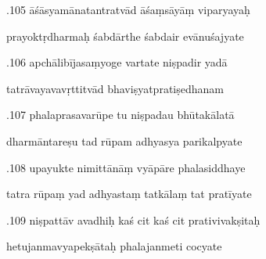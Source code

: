 \documentclass[article,12pt,a4paper]{memoir}%
\newcounter{parCount}
\begin{document}
	  
	  \pstart {}.105 āśāsyamānatantratvād āśaṃsāyāṃ viparyayaḥ 
	{}
	\pend%
      

	  
	  \pstart \leavevmode%
	prayoktṛdharmaḥ śabdārthe śabdair evānuśajyate 
	{}
	\pend%
      

	  
	  \pstart {}.106 apchālibījasaṃyoge vartate niṣpadir yadā 
	{}
	\pend%
      

	  
	  \pstart \leavevmode%
	tatrāvayavavṛttitvād bhaviṣyatpratiṣedhanam 
	{}
	\pend%
      

	  
	  \pstart {}.107 phalaprasavarūpe tu niṣpadau bhūtakālatā 
	{}
	\pend%
      

	  
	  \pstart \leavevmode%
	dharmāntareṣu tad rūpam adhyasya parikalpyate 
	{}
	\pend%
      

	  
	  \pstart {}.108 upayukte nimittānāṃ vyāpāre phalasiddhaye 
	{}
	\pend%
      

	  
	  \pstart \leavevmode%
	tatra rūpaṃ yad adhyastaṃ tatkālaṃ tat pratīyate 
	{}
	\pend%
      

	  
	  \pstart {}.109 niṣpattāv avadhiḥ kaś cit kaś cit prativivakṣitaḥ 
	{}
	\pend%
      

	  
	  \pstart \leavevmode%
	hetujanmavyapekṣātaḥ phalajanmeti cocyate 
	{}
	\pend%
      
\end{document}
